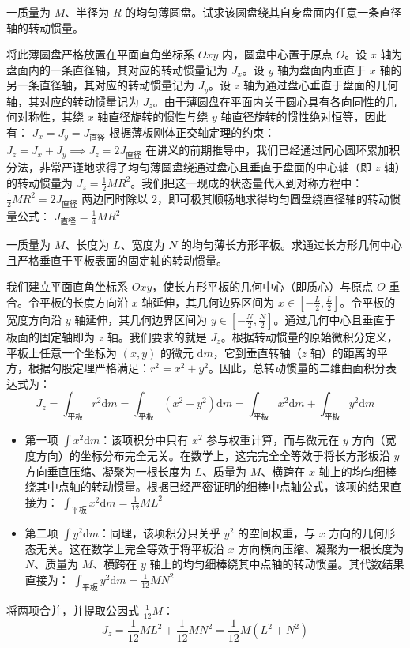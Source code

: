 \documentclass[lang=cn,11pt]{elegantbook}
\begin{document}
\begin{example}
一质量为 $M$、半径为 $R$ 的均匀薄圆盘。试求该圆盘绕其自身盘面内任意一条直径轴的转动惯量。
\end{example}
\begin{solution}
 将此薄圆盘严格放置在平面直角坐标系 $Oxy$ 内，圆盘中心置于原点 $O$。设 $x$ 轴为盘面内的一条直径轴，其对应的转动惯量记为 $J_x$。设 $y$ 轴为盘面内垂直于 $x$ 轴的另一条直径轴，其对应的转动惯量记为 $J_y$。设 $z$ 轴为通过盘心垂直于盘面的几何轴，其对应的转动惯量记为 $J_z$。由于薄圆盘在平面内关于圆心具有各向同性的几何对称性，其绕 $x$ 轴直径旋转的惯性与绕 $y$ 轴直径旋转的惯性绝对恒等，因此有： \(J_x = J_y = J_{\text{直径}}\) 根据薄板刚体正交轴定理的约束： \(J_z = J_x + J_y \implies J_z = 2J_{\text{直径}}\) 在讲义的前期推导中，我们已经通过同心圆环累加积分法，非常严谨地求得了均匀薄圆盘绕通过盘心且垂直于盘面的中心轴（即 $z$ 轴）的转动惯量为 $J_z = \frac{1}{2}MR^2$。我们把这一现成的状态量代入到对称方程中： \(\frac{1}{2}MR^2 = 2J_{\text{直径}}\) 两边同时除以 2，即可极其顺畅地求得均匀圆盘绕直径轴的转动惯量公式： \(J_{\text{直径}} = \frac{1}{4}MR^2\) 
\end{solution}

\begin{example}
一质量为 $M$、长度为 $L$、宽度为 $N$ 的均匀薄长方形平板。求通过长方形几何中心且严格垂直于平板表面的固定轴的转动惯量。
\end{example}
\begin{solution}
 我们建立平面直角坐标系 $Oxy$，使长方形平板的几何中心（即质心）与原点 $O$ 重合。令平板的长度方向沿 $x$ 轴延伸，其几何边界区间为 $x \in \left[-\frac{L}{2}, \frac{L}{2}\right]$。令平板的宽度方向沿 $y$ 轴延伸，其几何边界区间为 $y \in \left[-\frac{N}{2}, \frac{N}{2}\right]$。通过几何中心且垂直于板面的固定轴即为 $z$ 轴。我们要求的就是 $J_z$。根据转动惯量的原始微积分定义，平板上任意一个坐标为 $(x, y)$ 的微元 $\mathrm{d}m$，它到垂直转轴（$z$ 轴）的距离的平方，根据勾股定理严格满足：$r^2 = x^2 + y^2$。因此，总转动惯量的二维曲面积分表达式为：$$J_z = \int_{\text{平板}} r^2 \mathrm{d}m = \int_{\text{平板}} (x^2 + y^2) \mathrm{d}m= \int_{\text{平板}} x^2 \mathrm{d}m + \int_{\text{平板}} y^2 \mathrm{d}m$$
 \begin{itemize}
 \item 第一项 $\int x^2 \mathrm{d}m$：该项积分中只有 $x^2$ 参与权重计算，而与微元在 $y$ 方向（宽度方向）的坐标分布完全无关。在数学上，这完完全全等效于将长方形板沿 $y$ 方向垂直压缩、凝聚为一根长度为 $L$、质量为 $M$、横跨在 $x$ 轴上的均匀细棒绕其中点轴的转动惯量。根据已经严密证明的细棒中点轴公式，该项的结果直接为： \(\int_{\text{平板}} x^2 \mathrm{d}m = \frac{1}{12}ML^2\) 
 \item 第二项 $\int y^2 \mathrm{d}m$：同理，该项积分只关乎 $y^2$ 的空间权重，与 $x$ 方向的几何形态无关。这在数学上完全等效于将平板沿 $x$ 方向横向压缩、凝聚为一根长度为 $N$、质量为 $M$、横跨在 $y$ 轴上的均匀细棒绕其中点轴的转动惯量。其代数结果直接为： \(\int_{\text{平板}} y^2 \mathrm{d}m = \frac{1}{12}MN^2\) 
 \end{itemize}
 将两项合并，并提取公因式 $\frac{1}{12}M$：$$J_z = \frac{1}{12}ML^2 + \frac{1}{12}MN^2 = \frac{1}{12}M(L^2 + N^2)$$
\end{solution}
\end{document}
